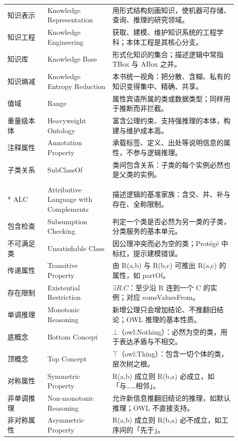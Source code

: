 \begin{longtable}{@{}p{0.16\linewidth}p{0.26\linewidth}p{0.5\linewidth}@{}}
知识表示 & Knowledge Representation & 用形式结构刻画知识，使机器可存储、查询、推理的研究领域。 \\
知识工程 & Knowledge Engineering & 获取、建模、维护知识系统的工程学科；本体工程是其核心分支。 \\
知识库 & Knowledge Base & 形式化知识的集合；描述逻辑中常指 TBox 与 ABox 之并。 \\
知识熵减 & Knowledge Entropy Reduction & 本书统一视角：把分散、含糊、私有的知识变得集中、精确、共享。 \\
值域 & Range & 属性宾语所属的类或数据类型；同样用于推断而非拦截。 \\
重量级本体 & Heavyweight Ontology & 富含公理约束、支持强推理的本体，构建与维护成本高。 \\
注释属性 & Annotation Property & 承载标签、定义、出处等说明信息的属性，不参与逻辑推理。 \\
子类关系 & SubClassOf & 类间包含关系：子类的每个实例必然也是父类的实例。 \\
\addlinespace[10pt]
\multicolumn{3}{@{}l}{\textbf{——描述逻辑与推理——}} \\*
\addlinespace[3pt]
ALC & Attributive Language with Complements & 描述逻辑的基准家族：含交、并、补与存在、全称限制。 \\
包含检查 & Subsumption Checking & 判定一个类是否必然为另一类的子类，分类服务的基本单元。 \\
不可满足类 & Unsatisfiable Class & 因公理冲突而必为空的类；Protégé 中标红，提示建模错误。 \\
传递属性 & Transitive Property & 由 R(a,b) 与 R(b,c) 可推出 R(a,c) 的属性，如 partOf。 \\
存在限制 & Existential Restriction & \(\exists R.C\)：至少沿 R 连到一个 C 的实例；对应 someValuesFrom。 \\
单调推理 & Monotonic Reasoning & 新增公理只会增加结论、不推翻旧结论；OWL 推理的基本性质。 \\
底概念 & Bottom Concept & \(\bot\)（owl:Nothing）：必然为空的类，用于表达矛盾与不相交。 \\
顶概念 & Top Concept & \(\top\)（owl:Thing）：包含一切个体的类，层次树之根。 \\
对称属性 & Symmetric Property & R(a,b) 成立则 R(b,a) 必成立，如「与……相邻」。 \\
非单调推理 & Non-monotonic Reasoning & 允许新信息推翻旧结论的推理，如默认推理；OWL 不直接支持。 \\
非对称属性 & Asymmetric Property & R(a,b) 成立则 R(b,a) 必不成立，如工序间的「先于」。 \\

\end{longtable}
